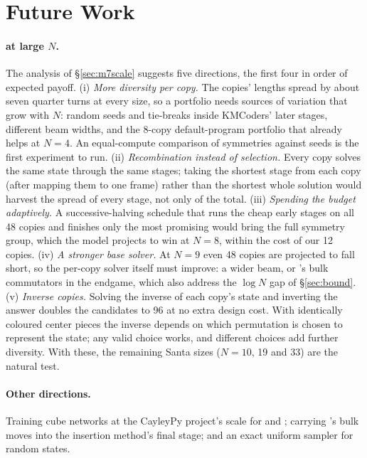 \section{Future Work}
\label{sec:future}

\paragraph{\Mseven at large $N$.} The analysis of \S\ref{sec:m7scale} suggests five directions, the first four in order of expected payoff.
(i) \emph{More diversity per copy.} The copies' lengths spread by about seven quarter turns at every size, so a portfolio needs
sources of variation that grow with $N$: random seeds and tie-breaks inside KMCoders' later stages, different beam widths, and
the 8-copy default-program portfolio that already helps at $N=4$. An equal-compute comparison of symmetries against seeds is the
first experiment to run. (ii) \emph{Recombination instead of selection.} Every copy solves the same state through the same stages;
taking the shortest stage from each copy (after mapping them to one frame) rather than the shortest whole solution would harvest
the spread of every stage, not only of the total. (iii) \emph{Spending the budget adaptively.} A successive-halving schedule that
runs the cheap early stages on all 48 copies and finishes only the most promising would bring the full symmetry group, which the
model projects to win at $N=8$, within the cost of our 12 copies. (iv) \emph{A stronger base solver.} At $N=9$ even 48 copies are
projected to fall short, so the per-copy solver itself must improve: a wider beam, or \FiveC's bulk commutators in the endgame,
which also address the $\log N$ gap of \S\ref{sec:bound}. (v) \emph{Inverse copies.} Solving the inverse of each
copy's state and inverting the answer doubles the candidates to 96 at no extra design cost. With identically coloured center
pieces the inverse depends on which permutation is chosen to represent the state; any valid choice works, and different
choices add further diversity. With these, the remaining Santa sizes ($N=10$, 19 and 33) are the
natural test.

\paragraph{Other directions.} Training cube networks at the CayleyPy project's scale for \Mfour and \FiveA; carrying \FiveC's bulk moves
into the insertion method's final stage; and an exact uniform sampler for random states.

